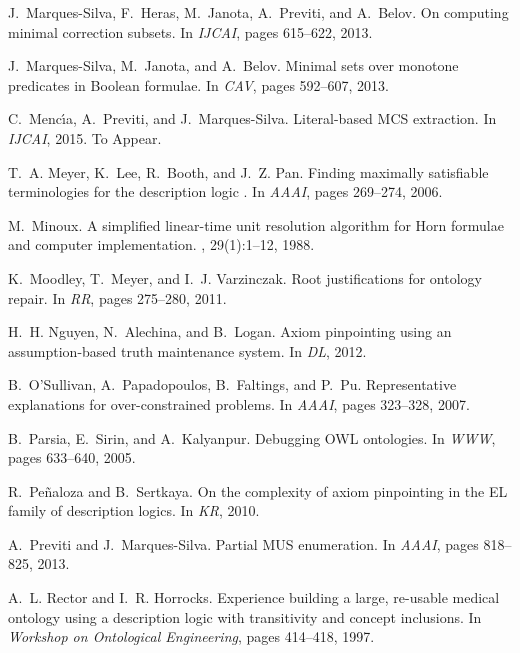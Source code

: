 \documentclass{llncs}
\begin{document}
\begin{thebibliography}{10}
J.~Marques{-}Silva, F.~Heras, M.~Janota, A.~Previti, and A.~Belov.
\newblock On computing minimal correction subsets.
\newblock In {\em IJCAI}, pages 615--622, 2013.

J.~Marques-Silva, M.~Janota, and A.~Belov.
\newblock Minimal sets over monotone predicates in {B}oolean formulae.
\newblock In {\em CAV}, pages 592--607, 2013.

C.~Menc\'{\i}a, A.~Previti, and J.~Marques-Silva.
\newblock Literal-based {MCS} extraction.
\newblock In {\em IJCAI}, 2015.
\newblock To Appear.

T.~A. Meyer, K.~Lee, R.~Booth, and J.~Z. Pan.
\newblock Finding maximally satisfiable terminologies for the description logic
  .
\newblock In {\em AAAI}, pages 269--274, 2006.

M.~Minoux.
 {A} simplified linear-time unit resolution algorithm for
  {H}orn formulae and computer implementation.
, 29(1):1--12, 1988.

K.~Moodley, T.~Meyer, and I.~J. Varzinczak.
\newblock Root justifications for ontology repair.
\newblock In {\em RR}, pages 275--280, 2011.

H.~H. Nguyen, N.~Alechina, and B.~Logan.
\newblock Axiom pinpointing using an assumption-based truth maintenance system.
\newblock In {\em DL}, 2012.

B.~O'Sullivan, A.~Papadopoulos, B.~Faltings, and P.~Pu.
\newblock Representative explanations for over-constrained problems.
\newblock In {\em AAAI}, pages 323--328, 2007.

B.~Parsia, E.~Sirin, and A.~Kalyanpur.
\newblock Debugging {OWL} ontologies.
\newblock In {\em WWW}, pages 633--640, 2005.

R.~Pe{\~{n}}aloza and B.~Sertkaya.
\newblock On the complexity of axiom pinpointing in the {EL} family of
  description logics.
\newblock In {\em KR}, 2010.

A.~Previti and J.~Marques{-}Silva.
\newblock Partial {MUS} enumeration.
\newblock In {\em AAAI}, pages 818--825, 2013.

A.~L. Rector and I.~R. Horrocks.
\newblock Experience building a large, re-usable medical ontology using a
  description logic with transitivity and concept inclusions.
\newblock In {\em Workshop on Ontological Engineering}, pages 414--418, 1997.


\end{thebibliography}
\end{document}
